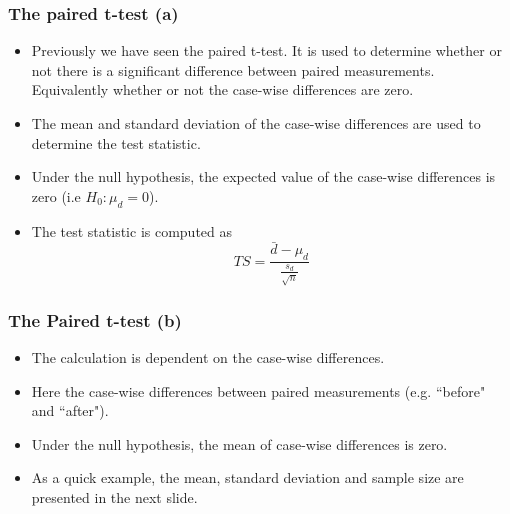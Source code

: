\documentclass[a4]{beamer}
\begin{document}
\begin{frame}
\frametitle{The paired t-test (a)}

\begin{itemize}
\item Previously we have seen the paired t-test. It is used to determine whether or
not there is a significant difference between paired measurements. Equivalently whether or not
the case-wise differences are zero.
\item The mean and standard deviation of the case-wise differences are used to determine the test statistic.
\item Under the null hypothesis, the expected value of the case-wise differences is zero (i.e $H_0 : \mu_d = 0$).
\item The test statistic is computed as
\[ TS = \frac{\bar{d} - \mu_d}{\frac{s_d}{\sqrt{n}}} \]
\end{itemize}
\end{frame}


\begin{frame}[fragile]
\frametitle{The Paired t-test (b)}
\begin{itemize}
\item The calculation is dependent on the case-wise differences.
\item Here the case-wise differences between paired measurements (e.g. ``before" and ``after").
\item Under the null hypothesis, the mean of case-wise differences is zero.
\item As a quick example, the mean, standard deviation and sample size are presented in the next slide.
\end{itemize}
\end{frame}
\end{document}
